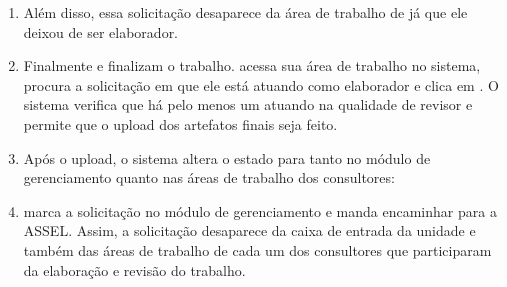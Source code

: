 \begin{landscape}
\begin{enumerate}


	
	\item Além disso, essa solicitação desaparece da área de trabalho de \ED já que ele deixou de ser elaborador.
	
	\item Finalmente \EU e \RU finalizam o trabalho. \EU acessa sua área de trabalho no sistema, procura a solicitação \SOLT em que ele está atuando como elaborador e clica em \bConcluir. O sistema verifica que há pelo menos um \CL atuando na qualidade de revisor e permite que o upload dos artefatos finais seja feito.

	\item Após o upload, o sistema altera o estado para  tanto no módulo de gerenciamento quanto nas áreas de trabalho dos consultores:
	


		
	\item \ST marca a solicitação no módulo de gerenciamento e manda encaminhar para a ASSEL. Assim, a solicitação desaparece da caixa de entrada da unidade e também das áreas de trabalho de cada um dos consultores que participaram da elaboração e revisão do trabalho.
\end{enumerate}

\end{landscape}

\pagebreak


